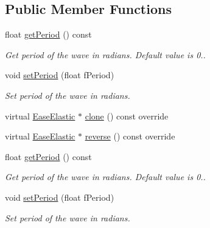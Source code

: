 \subsection*{Public Member Functions}
\begin{DoxyCompactItemize}
\item 
float \hyperlink{classEaseElastic_aa9ca56d793366495e88753f7b1ac4f6d}{get\+Period} () const
\begin{DoxyCompactList}\small\item\em Get period of the wave in radians. Default value is 0.. \end{DoxyCompactList}\item 
void \hyperlink{classEaseElastic_a39cf4fafe8c792cd81d0bf48eaa11f34}{set\+Period} (float f\+Period)
\begin{DoxyCompactList}\small\item\em Set period of the wave in radians. \end{DoxyCompactList}\item 
virtual \hyperlink{classEaseElastic}{Ease\+Elastic} $\ast$ \hyperlink{classEaseElastic_a72d5dc8a380dbb00e68c1d7c80258d28}{clone} () const override
\item 
virtual \hyperlink{classEaseElastic}{Ease\+Elastic} $\ast$ \hyperlink{classEaseElastic_a9e0e8c55fbe1c50c706dd3d62834ed82}{reverse} () const override
\item 
float \hyperlink{classEaseElastic_aa9ca56d793366495e88753f7b1ac4f6d}{get\+Period} () const
\begin{DoxyCompactList}\small\item\em Get period of the wave in radians. Default value is 0.. \end{DoxyCompactList}\item 
void \hyperlink{classEaseElastic_a39cf4fafe8c792cd81d0bf48eaa11f34}{set\+Period} (float f\+Period)
\begin{DoxyCompactList}\small\item\em Set period of the wave in radians. \end{DoxyCompactList}\end{DoxyCompactItemize}
